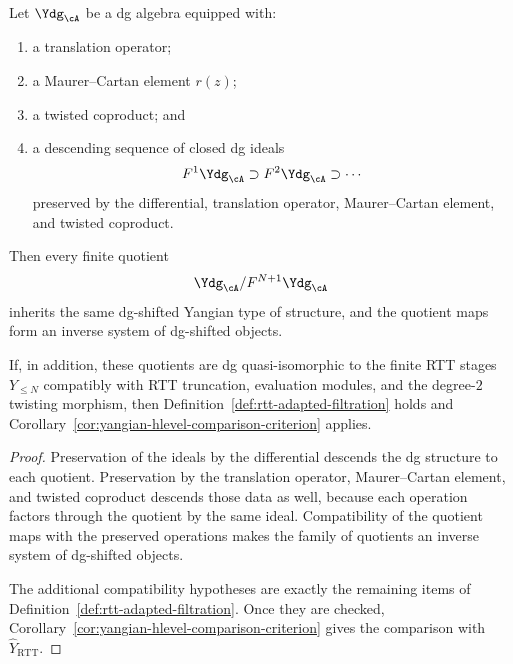 \begin{proposition}
\label{prop:dg-shifted-quotient-criterion}
Let $\Ydg_{\cA}$ be a dg algebra equipped with:
\begin{enumerate}
\item a translation operator;
\item a Maurer--Cartan element $r(z)$;
\item a twisted coproduct; and
\item a descending sequence of closed dg ideals
  \[
  F^1\Ydg_{\cA} \supset F^2\Ydg_{\cA} \supset \cdots
  \]
  preserved by the differential, translation operator,
  Maurer--Cartan element, and twisted coproduct.
\end{enumerate}
Then every finite quotient
\[
\Ydg_{\cA}/F^{N+1}\Ydg_{\cA}
\]
inherits the same dg-shifted Yangian type of structure, and the quotient
maps form an inverse system of dg-shifted objects.

If, in addition, these quotients are dg quasi-isomorphic to the finite
RTT stages $Y_{\le N}$ compatibly with RTT truncation, evaluation
modules, and the degree-$2$ twisting morphism, then
Definition~\ref{def:rtt-adapted-filtration} holds and
Corollary~\ref{cor:yangian-hlevel-comparison-criterion} applies.
\end{proposition}

\begin{proof}
Preservation of the ideals by the differential descends the dg
structure to each quotient.  Preservation by the translation operator,
Maurer--Cartan element, and twisted coproduct descends those data as
well, because each operation factors through the quotient by the same
ideal.  Compatibility of the quotient maps with the preserved
operations makes the family of quotients an inverse system of
dg-shifted objects.

The additional compatibility hypotheses are exactly the remaining items
of Definition~\ref{def:rtt-adapted-filtration}.  Once they are checked,
Corollary~\ref{cor:yangian-hlevel-comparison-criterion} gives the
comparison with $\widehat Y_{\mathrm{RTT}}$.
\end{proof}

